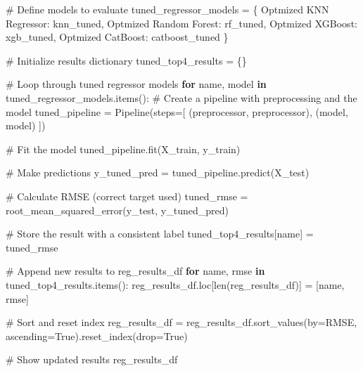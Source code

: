 \documentclass[
  letterpaper,
  DIV=11,
  numbers=noendperiod]{scrreprt}
\newenvironment{Shaded}{\begin{snugshade}}{\end{snugshade}}
\newcommand{\BuiltInTok}[1]{\textcolor[rgb]{0.00,0.23,0.31}{#1}}
\newcommand{\CommentTok}[1]{\textcolor[rgb]{0.37,0.37,0.37}{#1}}
\newcommand{\ControlFlowTok}[1]{\textcolor[rgb]{0.00,0.23,0.31}{\textbf{#1}}}
\newcommand{\KeywordTok}[1]{\textcolor[rgb]{0.00,0.23,0.31}{\textbf{#1}}}
\newcommand{\NormalTok}[1]{\textcolor[rgb]{0.00,0.23,0.31}{#1}}
\newcommand{\OperatorTok}[1]{\textcolor[rgb]{0.37,0.37,0.37}{#1}}
\newcommand{\StringTok}[1]{\textcolor[rgb]{0.13,0.47,0.30}{#1}}
\newcommand{\VariableTok}[1]{\textcolor[rgb]{0.07,0.07,0.07}{#1}}
\begin{document}
\begin{Shaded}
\begin{Highlighting}[]
\CommentTok{\# Define models to evaluate}
\NormalTok{tuned\_regressor\_models }\OperatorTok{=}\NormalTok{ \{}
    \StringTok{\textquotesingle{}Optmized KNN Regressor\textquotesingle{}}\NormalTok{: knn\_tuned,}
    \StringTok{\textquotesingle{}Optmized Random Forest\textquotesingle{}}\NormalTok{: rf\_tuned,}
    \StringTok{\textquotesingle{}Optmized XGBoost\textquotesingle{}}\NormalTok{: xgb\_tuned,}
    \StringTok{\textquotesingle{}Optmized CatBoost\textquotesingle{}}\NormalTok{: catboost\_tuned}
\NormalTok{\}}
\end{Highlighting}
\end{Shaded}

\begin{Shaded}
\begin{Highlighting}[]
\CommentTok{\# Initialize results dictionary}
\NormalTok{tuned\_top4\_results }\OperatorTok{=}\NormalTok{ \{\}}

\CommentTok{\# Loop through tuned regressor models}
\ControlFlowTok{for}\NormalTok{ name, model }\KeywordTok{in}\NormalTok{ tuned\_regressor\_models.items():}
    \CommentTok{\# Create a pipeline with preprocessing and the model}
\NormalTok{    tuned\_pipeline }\OperatorTok{=}\NormalTok{ Pipeline(steps}\OperatorTok{=}\NormalTok{[}
\NormalTok{        (}\StringTok{\textquotesingle{}preprocessor\textquotesingle{}}\NormalTok{, preprocessor),}
\NormalTok{        (}\StringTok{\textquotesingle{}model\textquotesingle{}}\NormalTok{, model)}
\NormalTok{    ])}
    
    \CommentTok{\# Fit the model}
\NormalTok{    tuned\_pipeline.fit(X\_train, y\_train)}
    
    \CommentTok{\# Make predictions}
\NormalTok{    y\_tuned\_pred }\OperatorTok{=}\NormalTok{ tuned\_pipeline.predict(X\_test)}
    
    \CommentTok{\# Calculate RMSE (correct target used)}
\NormalTok{    tuned\_rmse }\OperatorTok{=}\NormalTok{ root\_mean\_squared\_error(y\_test, y\_tuned\_pred)}
    
    \CommentTok{\# Store the result with a consistent label}
\NormalTok{    tuned\_top4\_results[name] }\OperatorTok{=}\NormalTok{ tuned\_rmse}

\CommentTok{\# Append new results to reg\_results\_df}
\ControlFlowTok{for}\NormalTok{ name, rmse }\KeywordTok{in}\NormalTok{ tuned\_top4\_results.items():}
\NormalTok{    reg\_results\_df.loc[}\BuiltInTok{len}\NormalTok{(reg\_results\_df)] }\OperatorTok{=}\NormalTok{ [name, rmse]}

\CommentTok{\# Sort and reset index}
\NormalTok{reg\_results\_df }\OperatorTok{=}\NormalTok{ reg\_results\_df.sort\_values(by}\OperatorTok{=}\StringTok{\textquotesingle{}RMSE\textquotesingle{}}\NormalTok{, ascending}\OperatorTok{=}\VariableTok{True}\NormalTok{).reset\_index(drop}\OperatorTok{=}\VariableTok{True}\NormalTok{)}

\CommentTok{\# Show updated results}
\NormalTok{reg\_results\_df}
\end{Highlighting}
\end{Shaded}
\end{document}
